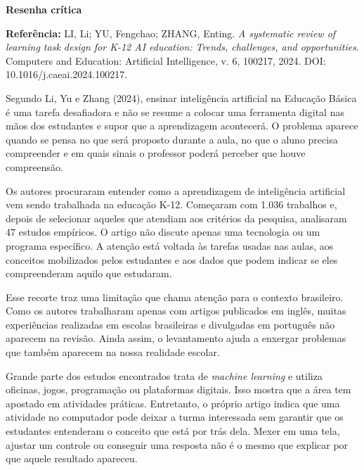 \documentclass[12pt,a4paper]{article}
\begin{document}
\begin{center}
{\Large\bfseries Resenha crítica}\par
\vspace{0.8em}
\begin{minipage}{0.9\textwidth}
\small\textbf{Referência:} LI, Li; YU, Fengchao; ZHANG, Enting. \textit{A systematic review of learning task design for K-12 AI education: Trends, challenges, and opportunities}. Computers and Education: Artificial Intelligence, v. 6, 100217, 2024. DOI: 10.1016/j.caeai.2024.100217.
\end{minipage}
\end{center}



Segundo Li, Yu e Zhang (2024), ensinar inteligência artificial na Educação Básica é uma tarefa desafiadora e não se resume a colocar uma ferramenta digital nas mãos dos estudantes e supor que a aprendizagem acontecerá. O problema aparece quando se pensa no que será proposto durante a aula, no que o aluno precisa compreender e em quais sinais o professor poderá perceber que houve compreensão.

Os autores procuraram entender como a aprendizagem de inteligência artificial vem sendo trabalhada na educação K-12. Começaram com 1.036 trabalhos e, depois de selecionar aqueles que atendiam aos critérios da pesquisa, analisaram 47 estudos empíricos. O artigo não discute apenas uma tecnologia ou um programa específico. A atenção está voltada às tarefas usadas nas aulas, aos conceitos mobilizados pelos estudantes e aos dados que podem indicar se eles compreenderam aquilo que estudaram.

Esse recorte traz uma limitação que chama atenção para o contexto brasileiro. Como os autores trabalharam apenas com artigos publicados em inglês, muitas experiências realizadas em escolas brasileiras e divulgadas em português não aparecem na revisão. Ainda assim, o levantamento ajuda a enxergar problemas que também aparecem na nossa realidade escolar.

Grande parte dos estudos encontrados trata de \textit{machine learning} e utiliza oficinas, jogos, programação ou plataformas digitais. Isso mostra que a área tem apostado em atividades práticas. Entretanto, o próprio artigo indica que uma atividade no computador pode deixar a turma interessada sem garantir que os estudantes entenderam o conceito que está por trás dela. Mexer em uma tela, ajustar um controle ou conseguir uma resposta não é o mesmo que explicar por que aquele resultado apareceu.
\end{document}
